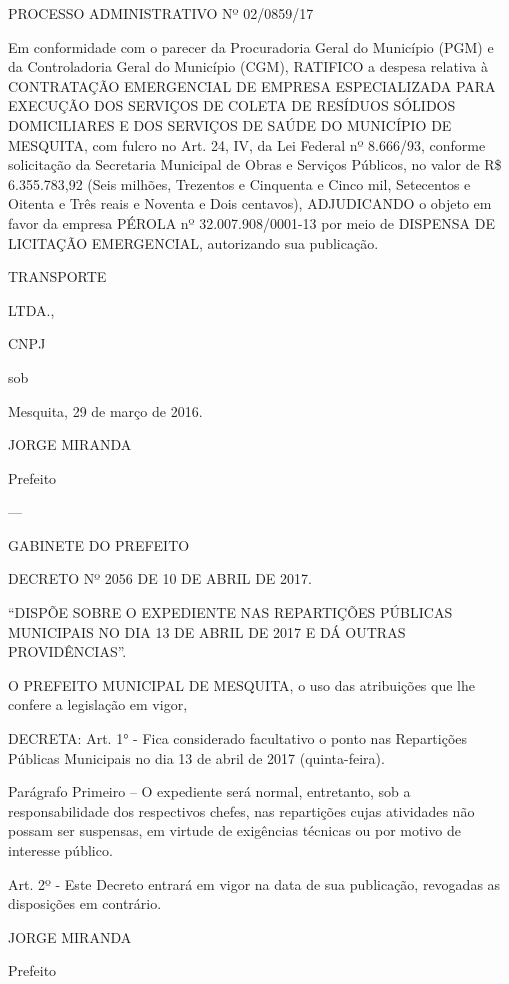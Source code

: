 \documentclass{doliberto}
\begin{document}
PROCESSO ADMINISTRATIVO Nº 02/0859/17 

Em conformidade com o parecer da Procuradoria Geral do 
Município  (PGM)  e  da  Controladoria  Geral  do  Município 
(CGM),  RATIFICO  a  despesa  relativa  à  CONTRATAÇÃO 
EMERGENCIAL  DE  EMPRESA  ESPECIALIZADA  PARA 
EXECUÇÃO  DOS  SERVIÇOS  DE  COLETA  DE  RESÍDUOS 
SÓLIDOS  DOMICILIARES  E  DOS  SERVIÇOS  DE  SAÚDE  DO 
MUNICÍPIO DE MESQUITA, com fulcro no Art. 24, IV, da Lei 
Federal  nº  8.666/93,  conforme  solicitação  da  Secretaria 
Municipal  de  Obras  e  Serviços  Públicos,  no  valor  de  R\$ 
6.355.783,92 (Seis milhões, Trezentos e Cinquenta e Cinco 
mil,  Setecentos  e  Oitenta  e  Três  reais  e  Noventa  e  Dois 
centavos),  ADJUDICANDO  o  objeto  em  favor  da  empresa 
PÉROLA 
nº 
32.007.908/0001-13 por meio de DISPENSA DE LICITAÇÃO 
EMERGENCIAL, autorizando sua publicação. 

TRANSPORTE 

LTDA., 

CNPJ 

sob 

Mesquita, 29 de março de 2016. 

JORGE MIRANDA 

Prefeito

---

GABINETE DO PREFEITO 

DECRETO Nº 2056 DE 10 DE ABRIL DE 2017. 

 
“DISPÕE  SOBRE  O  EXPEDIENTE  NAS 
REPARTIÇÕES  PÚBLICAS  MUNICIPAIS 
NO  DIA  13  DE  ABRIL  DE  2017  E  DÁ 
OUTRAS PROVIDÊNCIAS”.  

 
O  PREFEITO  MUNICIPAL  DE  MESQUITA,  o  uso  das 
atribuições que lhe confere a legislação em vigor,  

DECRETA: 
Art.  1°  -  Fica  considerado  facultativo  o  ponto  nas 
Repartições Públicas Municipais no dia 13 de abril de 2017 
(quinta-feira). 
 
Parágrafo  Primeiro  –  O  expediente  será  normal, 
entretanto,  sob  a  responsabilidade  dos  respectivos  chefes, 
nas repartições cujas atividades não possam ser suspensas, 
em  virtude  de  exigências  técnicas  ou  por  motivo  de 
interesse público. 
 
Art.  2º  -  Este  Decreto  entrará  em  vigor  na  data  de  sua 
publicação, revogadas as disposições em contrário.  

 

JORGE MIRANDA 

Prefeito 
\end{document}
